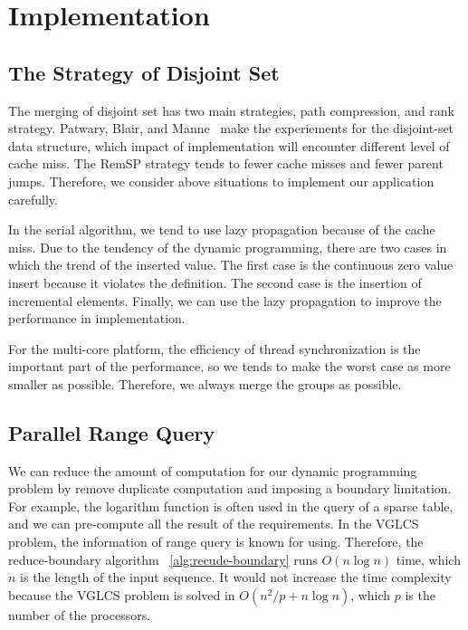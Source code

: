 \section{Implementation}
\label{sec:Implementation}

\subsection{The Strategy of Disjoint Set}

The merging of disjoint set has two main strategies, path compression,
and rank strategy.  Patwary, Blair, and
Manne~\cite{Patwary2010ExperimentsOU} make the experiements for the
disjoint-set data structure, which impact of implementation will
encounter different level of cache miss. The {\textrm RemSP} strategy
tends to fewer cache misses and fewer parent jumps.  Therefore, we consider above situations to implement our application carefully.

\iffalse
運行 VGLCS 時，將耗費 $\theta(n^2)$ 的內存空間。使用遞增後綴最大值 (ISMQ) 時，
採用並查集實作將會遭遇到很多不平衡的工作負載，其原因在於合併的策略，
常見的有路徑壓縮和啟發式合併兩種策略，這間接影響到不同次數的分枝判斷。
實務上須考慮到快取未中
\fi

In the serial algorithm, we tend to use lazy propagation because of the
cache miss.  Due to the tendency of the dynamic programming, there are
two cases in which the trend of the inserted value.  The first case is
the continuous zero value insert because it violates the definition.
The second case is the insertion of incremental elements.  Finally, we
can use the lazy propagation to improve the performance in
implementation.

For the multi-core platform, the efficiency of thread synchronization is
the important part of the performance, so we tends to make the worst case as more smaller as possible.  Therefore, we always merge the groups as possible.

\iffalse
每個執行緒負責數個完整的并查集，操作時應偏向延遲標記操作，
儘早合併的策略易造成快取未中。由於動態規劃的傾向中，插入值的趨勢有兩種情況，
其一為連續不合定義的零元素插入，其二為遞增元素的插入，在這兩者穿插的趨勢中，
我們發現延遲操作將會帶來較能改善快取未中問題。
\fi

\subsection{Parallel Range Query}

We can reduce the amount of computation for our dynamic programming
problem by remove duplicate computation and imposing a boundary
limitation.  For example, the logarithm function is often used in the query of a sparse table, and we can pre-compute all the result of the requirements.  In the VGLCS problem, the information of range query is known for using.  Therefore, the reduce-boundary algorithm
~\ref{alg:recude-boundary} runs $O(n \log n)$ time, which $n$ is the length of the input sequence.  It would not increase the time complexity because the VGLCS problem is solved in $O(n^2 / p + n \log n)$, which $p$ is the number of the processors.


